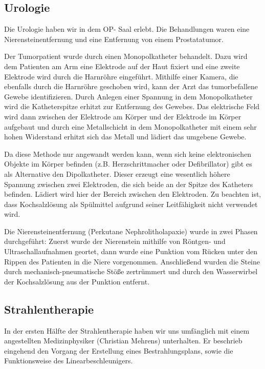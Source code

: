 \documentclass[11pt,a4paper,titlepage]{scrartcl}
\begin{document}
\subsection{Urologie}

Die Urologie haben wir in dem OP- Saal erlebt.
Die Behandlungen waren eine Nierensteinentfernung und eine Entfernung von einem Prostatatumor. \medskip

Der Tumorpatient wurde durch einen Monopolkatheter behandelt.
Dazu wird dem Patienten am Arm eine Elektrode auf der Haut fixiert und eine zweite Elektrode wird durch die Harnröhre eingeführt.
Mithilfe einer Kamera, die ebenfalls durch die Harnröhre geschoben wird, kann der Arzt das tumorbefallene Gewebe identifizieren.
Durch Anlegen einer Spannung in dem Monopolkatheter wird die Katheterspitze erhitzt zur Entfernung des Gewebes.
Das elektrische Feld wird dann zwischen der Elektrode am Körper und der Elektrode im Körper aufgebaut und durch eine Metallschicht in dem Monopolkatheter mit einem sehr hohen Widerstand erhitzt sich das Metall und lädiert das umgebene Gewebe.\medskip

Da diese Methode nur angewandt werden kann, wenn sich keine elektronischen Objekte im Körper befinden (z.B. Herzschrittmacher oder Defibrillator) gibt es als Alternative den Dipolkatheter.
Dieser erzeugt eine wesentlich höhere Spannung zwischen zwei Elektroden, die sich beide an der Spitze des Katheters befinden.
Lädiert wird hier der Bereich zwischen den Elektroden. Zu beachten ist, dass Kochsalzlösung als Spülmittel aufgrund seiner Leitfähigkeit nicht verwendet wird. \medskip

Die Nierensteinentfernung (Perkutane Nephrolitholapaxie) wurde in zwei Phasen durchgeführt: Zuerst wurde der Nierenstein mithilfe von Röntgen- und Ultraschallaufnahmen geortet, dann wurde eine Punktion vom Rücken unter den Rippen des Patienten in die Niere vorgenommen.
Anschließend wurden die Steine durch mechanisch-pneumatische Stöße zertrümmert und durch den Wasserwirbel der Kochsalzlösung aus der Punktion entfernt.



\subsection{Strahlentherapie}

In der ersten Hälfte der Strahlentherapie haben wir uns umfänglich mit einem angestellten Medizinphysiker (Christian Mehrens) unterhalten.
Er beschrieb eingehend den Vorgang der Erstellung eines Bestrahlungsplans, sowie die Funktionsweise des Linearbeschleunigers. \medskip
\end{document}
